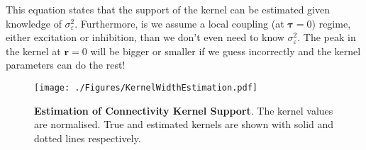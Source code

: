 \documentclass[]{article}
\begin{document}
 This equation states that the support of the kernel can be estimated given knowledge of $\sigma_\varepsilon^2$. Furthermore, is we assume a local coupling (at $\boldsymbol\tau=0$) regime, either excitation or inhibition, than we don't even need to know $\sigma_\varepsilon^2$. The peak in the kernel at $\mathbf{r}=0$ will be bigger or smaller if we guess incorrectly and the kernel parameters can do the rest! 
\newpage
\begin{figure}[!ht]
\begin{center}
\texttt{[image: ./Figures/KernelWidthEstimation.pdf]}
\end{center}
\caption{{\bf Estimation of Connectivity Kernel Support}. The kernel values are normalised. True  and estimated kernels are shown with solid and dotted lines respectively.}
\label{fig:KernelWidth}
\end{figure}
\end{document}
